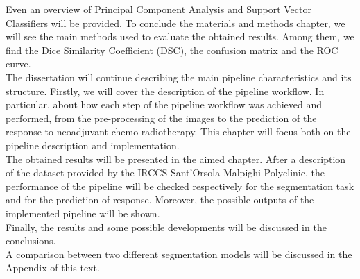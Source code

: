 \documentclass{standalone}
\begin{document}
Even an overview of Principal Component Analysis and Support Vector Classifiers will be provided.
To conclude the materials and methods chapter, we will see the main methods used to evaluate the obtained results.
Among them, we find the Dice Similarity Coefficient (DSC), the confusion matrix and the ROC curve.
\\
The dissertation will continue describing the main pipeline characteristics and its structure.
Firstly, we will cover the description of the pipeline workflow.
In particular, about how each step of the pipeline workflow was achieved and performed, from the pre-processing of the images to the prediction of the response to neoadjuvant chemo-radiotherapy.
This chapter will focus both on the pipeline description and implementation. 
\\
The obtained results will be presented in the aimed chapter.
After a description of the dataset provided by the IRCCS Sant’Orsola-Malpighi Polyclinic, the performance of the pipeline will be checked respectively for the segmentation task and for the prediction of response.
Moreover, the possible outputs of the implemented pipeline will be shown.
\\
Finally, the results and some possible developments will be discussed in the conclusions.
\\
A comparison between two different segmentation models will be discussed in the Appendix of this text.
\end{document}
